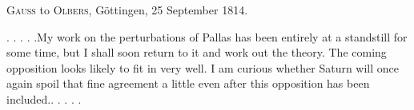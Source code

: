 \par{}\bigskip
\begin{center}
\textsc{Gauss} to \textsc{Olbers}, Göttingen, 25 September 1814.
\end{center}
\noindent\hspace*{\parindent}. . . . .\quad My work on the perturbations of Pallas has been entirely at a standstill for some time, but I shall soon return to it and work out the theory. The coming opposition looks likely to fit in very well. I am curious whether Saturn will once again spoil that fine agreement a little even after this opposition has been included.\quad . . . . .
\par
